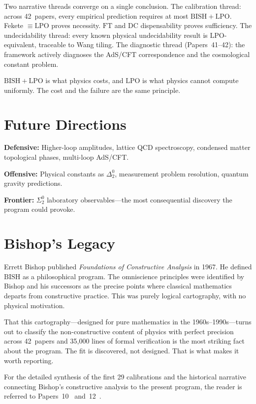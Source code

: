 \documentclass[11pt,a4paper]{report}
\theoremstyle{plain}
\theoremstyle{definition}
\theoremstyle{remark}
\newcommand{\BISH}{\mathrm{BISH}}
\newcommand{\LPO}{\mathrm{LPO}}
\newcommand{\FT}{\mathrm{FT}}
\newcommand{\DC}{\mathrm{DC}}
\begin{document}
Two narrative threads converge on a single conclusion. The calibration thread: across 42~papers, every empirical prediction requires at most $\BISH+\LPO$. Fekete $\equiv \LPO$ proves necessity. $\FT$ and $\DC$ dispensability proves sufficiency. The undecidability thread: every known physical undecidability result is $\LPO$-equivalent, traceable to Wang tiling. The diagnostic thread (Papers~41--42): the framework actively diagnoses the AdS/CFT correspondence and the cosmological constant problem.

$\BISH+\LPO$ is what physics costs, and $\LPO$ is what physics cannot compute uniformly. The cost and the failure are the same principle.

\section{Future Directions}

\textbf{Defensive:} Higher-loop amplitudes, lattice QCD spectroscopy, condensed matter topological phases, multi-loop AdS/CFT.

\textbf{Offensive:} Physical constants as $\Delta^0_2$, measurement problem resolution, quantum gravity predictions.

\textbf{Frontier:} $\Sigma^0_2$ laboratory observables---the most consequential discovery the program could provoke.

\section{Bishop's Legacy}

Errett Bishop published \emph{Foundations of Constructive Analysis} in 1967. He defined $\BISH$ as a philosophical program. The omniscience principles were identified by Bishop and his successors as the precise points where classical mathematics departs from constructive practice. This was purely logical cartography, with no physical motivation.

That this cartography---designed for pure mathematics in the 1960s--1990s---turns out to classify the non-constructive content of physics with perfect precision across 42~papers and 35{,}000 lines of formal verification is the most striking fact about the program. The fit is discovered, not designed. That is what makes it worth reporting.

For the detailed synthesis of the first 29 calibrations and the historical narrative connecting Bishop's constructive analysis to the present program, the reader is referred to Papers~10~\cite{Lee2026P10} and~12~\cite{Lee2026P12}.
\end{document}
